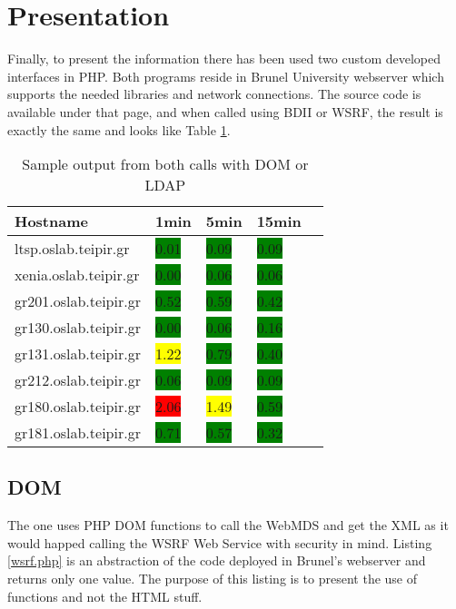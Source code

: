 \section{Presentation}

Finally, to present the information there has been used two custom developed interfaces in PHP. Both programs reside in Brunel University webserver which supports the needed libraries and network connections. The source code is available under that page, and when called using BDII or WSRF, the result is exactly the same and looks like Table \ref{tab:html_output}.

\begin{table}[ht]
\centering
\small\addtolength{\tabcolsep}{-3pt}
\begin{tabular}{ | l | l | l | l | l |}
\hline
 Hostname & 1min & 5min & 15min \\ \hline
 ltsp.oslab.teipir.gr & \colorbox{green}{0.01} & \colorbox{green}{0.09} & \colorbox{green}{0.09} \\ \hline
 xenia.oslab.teipir.gr & \colorbox{green}{0.00} & \colorbox{green}{0.06} & \colorbox{green}{0.06} \\ \hline
 gr201.oslab.teipir.gr & \colorbox{green}{0.52} & \colorbox{green}{0.59} & \colorbox{green}{0.42} \\ \hline
 gr130.oslab.teipir.gr & \colorbox{green}{0.00} & \colorbox{green}{0.06} & \colorbox{green}{0.16} \\ \hline
 gr131.oslab.teipir.gr & \colorbox{yellow}{1.22} & \colorbox{green}{0.79} & \colorbox{green}{0.40} \\ \hline
 gr212.oslab.teipir.gr & \colorbox{green}{0.06} & \colorbox{green}{0.09} & \colorbox{green}{0.09} \\ \hline
 gr180.oslab.teipir.gr & \colorbox{red}{2.06} & \colorbox{yellow}{1.49} & \colorbox{green}{0.59} \\ \hline
 gr181.oslab.teipir.gr & \colorbox{green}{0.71} & \colorbox{green}{0.57} & \colorbox{green}{0.32} \\ \hline
\end{tabular}
\caption{Sample output from both calls with DOM or LDAP}
\label{tab:html_output}
\end{table}

\subsection{DOM}

The one uses PHP DOM functions to call the WebMDS and get the XML as it would happed calling the WSRF Web Service with security in mind. Listing \ref{wsrf.php} is an abstraction of the code deployed in Brunel's webserver and returns only one value. The purpose of this listing is to present the use of functions and not the HTML stuff.


